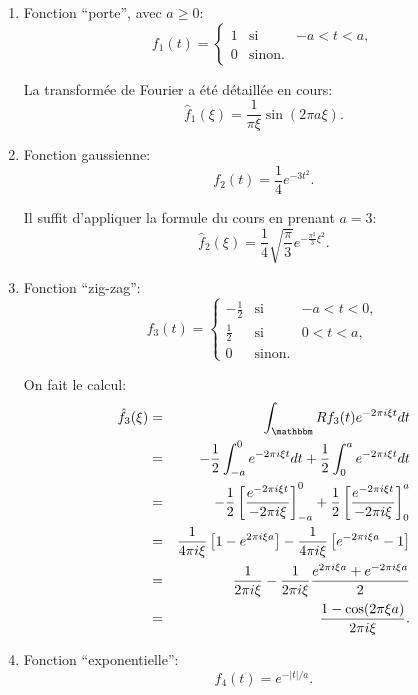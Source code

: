 \begin{exercice}

\begin{enumerate}
 \item Fonction ``porte'', avec $a \geq 0$:
 \[
  f_1 (t) = \left \{ \begin{array}{llr} 
  1 & \mbox{si }& -a<t<a,\\
  0 & \mbox{sinon.}
  \end{array}\right.
 \]

 La transformée de Fourier a été détaillée en cours:
 $$\hat{f}_1 (\xi) = \frac1{\pi \xi} \sin ( 2\pi a \xi).$$
 
 
 \item Fonction gaussienne:
 \[
  f_2(t) = \frac14 e^{-3 t^2}.
 \]
 
 Il suffit d'appliquer la formule du cours en prenant $a=3$:
 \[
  \hat{f}_2(\xi) = \frac14 \sqrt{\frac{\pi}{3}} e^{-\frac{\pi^2}{3} \xi^2}.
 \]

 
 \item Fonction ``zig-zag'':
 \[
  f_3 (t) = \left \{ \begin{array}{llr} 
  -\frac12 & \mbox{si }& -a<t<0,\\
  \frac12 & \mbox{si }& 0<t<a,\\
  0 & \mbox{sinon.}
  \end{array}\right.
 \]
 
 On fait le calcul:
 \begin{eqnarray*}
  \hat{f}_3 (\xi) & = & \int_\eR f_3(t) e^{-2\pi i \xi t} dt\\
  & = & -\frac12 \int_{-a}^0 e^{-2\pi i \xi t} dt
  + \frac12 \int_{0}^a e^{-2\pi i \xi t} dt\\
  & = & -\frac12 \left [ \frac{e^{-2\pi i \xi t}}{-2\pi i \xi} \right ]_{-a}^0 
  + \frac12 \left [ \frac{e^{-2\pi i \xi t}}{-2\pi i \xi} \right ]_{0}^a\\
  & = & \frac1{4\pi i \xi} \left [ 1 - e^{2\pi i \xi a} \right ]
  - \frac1{4\pi i \xi} \left [ e^{-2\pi i \xi a} - 1 \right ]\\
  & = & \frac1{2\pi i \xi} - \frac1{2 \pi i \xi} \frac{ e^{2\pi i \xi a} + e^{-2\pi i \xi a}}{2}\\
    & = & \frac{1-\cos (2\pi \xi a)}{2 \pi i \xi} .
 \end{eqnarray*}

 
 \item Fonction ``exponentielle'':
 \[
  f_4 (t) = e^{-|t|/a}.
 \]


\end{enumerate}
\end{exercice}
